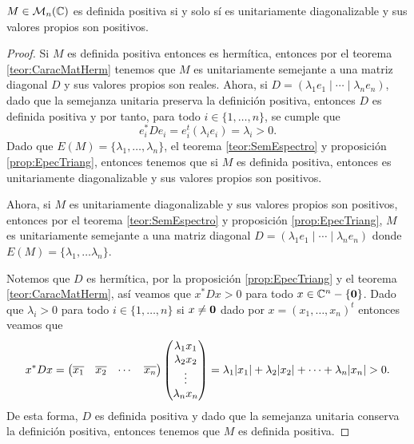 \begin{teor}
  $M \in \mathcal{M}_n(\mathbb{C})$ es definida positiva si y solo sí es unitariamente diagonalizable y sus valores propios son positivos.
\end{teor}
\begin{proof}
  Si $M$ es definida positiva entonces es hermítica, entonces por el teorema \ref{teor:CaracMatHerm} tenemos que $M$ es unitariamente semejante a una matriz diagonal $D$ y sus valores propios son reales. Ahora, si $D = (\lambda_1 e_1 \mid \cdots \mid  \lambda_n e_n)$, dado que la semejanza unitaria preserva la definición positiva, entonces $D$ es definida positiva y por tanto, para todo $i\in\{1,\ldots,n\}$, se cumple que
    \[
      e_i^* D e_i = e_i^t (\lambda_i e_i) = \lambda_i > 0.
    \]
  Dado que $E(M) = \{\lambda_1,\ldots,\lambda_n\}$, el teorema \ref{teor:SemEspectro} y proposición \ref{prop:EpecTriang}, entonces tenemos que si $M$ es definida positiva, entonces es unitariamente diagonalizable y sus valores propios son positivos.

  Ahora, si $M$ es unitariamente diagonalizable y sus valores propios son positivos, entonces por el teorema \ref{teor:SemEspectro} y proposición \ref{prop:EpecTriang}, $M$ es unitariamente semejante a una matriz diagonal $D = (\lambda_1 e_1 \mid \cdots \mid  \lambda_n e_n)$ donde $E(M) = \{\lambda_1, \ldots \lambda_n\}$.

  Notemos que $D$ es hermítica, por la proposición \ref{prop:EpecTriang} y el teorema \ref{teor:CaracMatHerm}, así veamos que $x^* D x > 0$ para todo $x \in \mathbb{C}^n - \{\mathbf{0}\}$. Dado que $\lambda_i > 0$ para todo $i \in \{1,\ldots,n\}$ si $x \neq \mathbf{0}$ dado por $x = (x_1, \ldots, x_n)^t$ entonces veamos que
  \[
    x^* D x 
      = \begin{pmatrix} \overline{x_1} & \overline{x_2} & \cdots & \overline{x_n} \end{pmatrix} 
        \begin{pmatrix} \lambda_1 x_1 \\ \lambda_2 x_2 \\ \vdots \\ \lambda_n x_n \end{pmatrix}
      = \lambda_1 \mathopen|x_1\mathclose| + \lambda_2 \mathopen|x_2\mathclose| + \cdots + \lambda_n \mathopen|x_n\mathclose| > 0.
  \]
  De esta forma, $D$ es definida positiva y dado que la semejanza unitaria conserva la definición positiva, entonces tenemos que $M$ es definida positiva.
\end{proof}